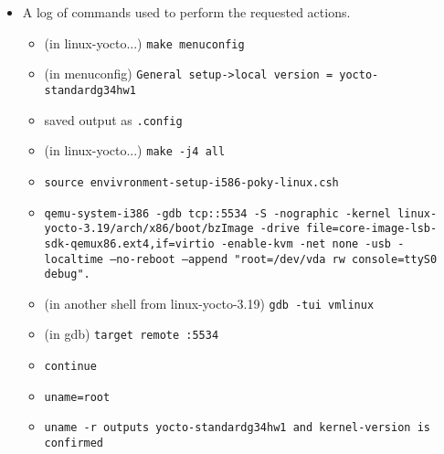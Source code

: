 \documentclass[titlepage,draftclsnofoot,onecolumn]{article}
\begin{document}
\begin{itemize}
  \item A log of commands used to perform the requested actions.
  \begin{itemize}
    \item (in linux-yocto...) \texttt{make menuconfig}
    \item (in menuconfig) \texttt{General setup->local version = yocto-standardg34hw1}
    \item saved output as \texttt{.config}
    \item (in linux-yocto...) \texttt{make -j4 all}
    \item \texttt{source envivronment-setup-i586-poky-linux.csh}
    \item \texttt{qemu-system-i386 -gdb tcp::5534 -S -nographic -kernel linux-yocto-3.19/arch/x86/boot/bzImage -drive file=core-image-lsb-sdk-qemux86.ext4,if=virtio -enable-kvm -net none -usb -localtime --no-reboot --append "root=/dev/vda rw console=ttyS0 debug".}
    \item (in another shell from linux-yocto-3.19) \texttt{gdb -tui vmlinux}
    \item (in gdb) \texttt{target remote :5534}
    \item \texttt{continue}
    \item \texttt{uname=root}
    \item \texttt{uname -r outputs yocto-standardg34hw1 and kernel-version is confirmed}


\end{itemize}
\end{itemize}
\end{document}
